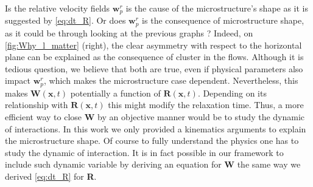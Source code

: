 Is the relative velocity fields $\textbf{w}_p^r$ is the cause of the microstructure's shape as it is suggested by \ref{eq:dt_R}. 
Or does $\textbf{w}_p^r$ is the consequence of microstructure shape, as it could be through looking at the previous graphs ?
Indeed, on \ref{fig:Why_l_matter} (right), the clear asymmetry with respect to the horizontal plane can be explained as the consequence of cluster  in the flows. 
Although it is tedious question, we believe that both are true, even if physical parameters also impact $\textbf{w}_p^r$, which makes the microstructure case dependent.  
Nevertheless, this makes $\textbf{W}(\textbf{x},t)$ potentially a function of $\textbf{R}(\textbf{x},t)$.
Depending on its relationship with $\textbf{R}(\textbf{x},t)$ this might modify the relaxation time.  
Thus, a more efficient way to close \textbf{W} by an objective manner would be to study the dynamic of interactions. 
In this work we only provided a kinematics arguments to explain the microstructure shape. 
Of course to fully understand the physics one has to study the dynamic of interaction. 
It is in fact possible in our framework to include such dynamic variable by deriving an equation for \textbf{W} the same way we derived \ref{eq:dt_R} for \textbf{R}.
